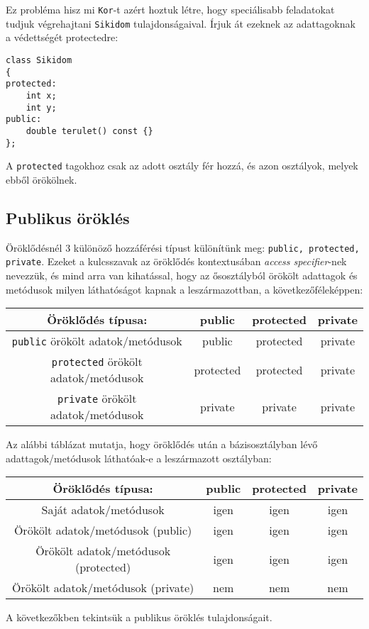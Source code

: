 \documentclass[a4paper,11.5pt,table]{article}
\begin{document}
	Ez probléma hisz mi \texttt{Kor}-t azért hoztuk létre, hogy speciálisabb feladatokat tudjuk végrehajtani \texttt{Sikidom} tulajdonságaival. Írjuk át ezeknek az adattagoknak a védettségét protectedre:
	\begin{lstlisting}
class Sikidom
{
protected:
	int x;
	int y;
public:
	double terulet() const {}
};
	\end{lstlisting}
	A \texttt{protected} tagokhoz csak az adott osztály fér hozzá, és azon osztályok, melyek ebből örökölnek.
	\subsection{Publikus öröklés}
	Öröklődésnél 3 különöző hozzáférési típust különítünk meg: \texttt{public, protected, private}. Ezeket a kulcsszavak az öröklődés kontextusában \textit{access specifier}-nek nevezzük, és mind arra van kihatással, hogy az ősosztályból örökölt adattagok és metódusok milyen láthatóságot kapnak a leszármazottban, a következőféleképpen:
	
	\begin{center}
		\begin{tabular}{|c||c|c|c|}
			\hline
			Öröklődés típusa:&public&protected&private\\
			\hline
			\hline
			\texttt{public} örökölt adatok/metódusok &\cellcolor{green!20}public&\cellcolor{orange!20}protected&\cellcolor{red!20}private\\
			\hline
			\texttt{protected} örökölt adatok/metódusok &\cellcolor{orange!20}protected&\cellcolor{orange!20}protected&\cellcolor{red!20}private\\
			\hline
			\texttt{private} örökölt adatok/metódusok &\cellcolor{red!20}private&\cellcolor{red!20}private&\cellcolor{red!20}private\\
			\hline
		\end{tabular}
	\end{center}
	Az alábbi táblázat mutatja, hogy öröklődés után a bázisosztályban lévő adattagok/metódusok láthatóak-e a leszármazott osztályban:
	\begin{center}
		\setlength{\extrarowheight}{2pt}
		\begin{tabular}{|c||c|c|c|}
			\hline
			Öröklődés típusa:&public&protected&private\\
			\hline
			\hline
			Saját adatok/metódusok& \cellcolor{green!20}igen&\cellcolor{green!20}igen&\cellcolor{green!20}igen\\
			\hline
			Örökölt adatok/metódusok (public)&\cellcolor{green!20}igen&\cellcolor{green!20}igen&\cellcolor{green!20}igen\\
			\hline
			Örökölt adatok/metódusok (protected)&\cellcolor{green!20}igen&\cellcolor{green!20}igen&\cellcolor{green!20}igen\\
			\hline
			Örökölt adatok/metódusok (private)&\cellcolor{red!20}nem&\cellcolor{red!20}nem&\cellcolor{red!20}nem\\
			\hline
		\end{tabular}
	\end{center}
	A következőkben tekintsük a publikus öröklés tulajdonságait.
	\medskip
	
\end{document}
